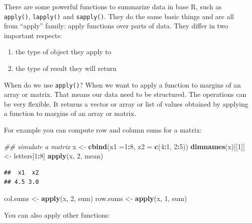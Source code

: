 \documentclass[12pt,]{krantz}
\makeatletter
\newenvironment{Shaded}{\begin{snugshade}}{\end{snugshade}}
\newcommand{\CommentTok}[1]{\textcolor[rgb]{0.37,0.37,0.37}{\textit{#1}}}
\newcommand{\DataTypeTok}[1]{\textcolor[rgb]{0.27,0.27,0.27}{#1}}
\newcommand{\DecValTok}[1]{\textcolor[rgb]{0.06,0.06,0.06}{#1}}
\newcommand{\KeywordTok}[1]{\textcolor[rgb]{0.27,0.27,0.27}{\textbf{#1}}}
\newcommand{\NormalTok}[1]{#1}
\newcommand{\OperatorTok}[1]{\textcolor[rgb]{0.43,0.43,0.43}{\textbf{#1}}}
\newcommand{\StringTok}[1]{\textcolor[rgb]{0.5,0.5,0.5}{#1}}
\providecommand{\tightlist}{%
  \setlength{\itemsep}{0pt}\setlength{\parskip}{0pt}}
\newenvironment{kframe}{%
\medskip{}
\setlength{\fboxsep}{.8em}
 \def\at@end@of@kframe{}%
 \ifinner\ifhmode%
  \def\at@end@of@kframe{\end{minipage}}%
  \begin{minipage}{\columnwidth}%
 \fi\fi%
 \def\FrameCommand##1{\hskip\@totalleftmargin \hskip-\fboxsep
 \colorbox{shadecolor}{##1}\hskip-\fboxsep
     \hskip-\linewidth \hskip-\@totalleftmargin \hskip\columnwidth}%
 \MakeFramed {\advance\hsize-\width
   \@totalleftmargin\z@ \linewidth\hsize
   \@setminipage}}%
 {\par\unskip\endMakeFramed%
 \at@end@of@kframe}
\renewenvironment{Shaded}{\begin{kframe}}{\end{kframe}}
\makeatother
\begin{document}
There are some powerful functions to summarize data in base R, such as \texttt{apply()}, \texttt{lapply()} and \texttt{sapply()}. They do the same basic things and are all from ``apply'' family: apply functions over parts of data. They differ in two important respects:

\begin{enumerate}
\def\labelenumi{\arabic{enumi}.}
\tightlist
\item
  the type of object they apply to
\item
  the type of result they will return
\end{enumerate}

When do we use \texttt{apply()}? When we want to apply a function to margins of an array or matrix. That means our data need to be structured. The operations can be very flexible. It returns a vector or array or list of values obtained by applying a function to margins of an array or matrix.

For example you can compute row and column sums for a matrix:

\begin{Shaded}
\begin{Highlighting}[]
\CommentTok{## simulate a matrix}
\NormalTok{x <-}\StringTok{ }\KeywordTok{cbind}\NormalTok{(}\DataTypeTok{x1 =}\DecValTok{1}\OperatorTok{:}\DecValTok{8}\NormalTok{, }\DataTypeTok{x2 =} \KeywordTok{c}\NormalTok{(}\DecValTok{4}\OperatorTok{:}\DecValTok{1}\NormalTok{, }\DecValTok{2}\OperatorTok{:}\DecValTok{5}\NormalTok{))}
\KeywordTok{dimnames}\NormalTok{(x)[[}\DecValTok{1}\NormalTok{]] <-}\StringTok{ }\NormalTok{letters[}\DecValTok{1}\OperatorTok{:}\DecValTok{8}\NormalTok{]}
\KeywordTok{apply}\NormalTok{(x, }\DecValTok{2}\NormalTok{, mean)}
\end{Highlighting}
\end{Shaded}

\begin{verbatim}
##  x1  x2 
## 4.5 3.0
\end{verbatim}

\begin{Shaded}
\begin{Highlighting}[]
\NormalTok{col.sums <-}\StringTok{ }\KeywordTok{apply}\NormalTok{(x, }\DecValTok{2}\NormalTok{, sum)}
\NormalTok{row.sums <-}\StringTok{ }\KeywordTok{apply}\NormalTok{(x, }\DecValTok{1}\NormalTok{, sum)}
\end{Highlighting}
\end{Shaded}

You can also apply other functions:
\end{document}
